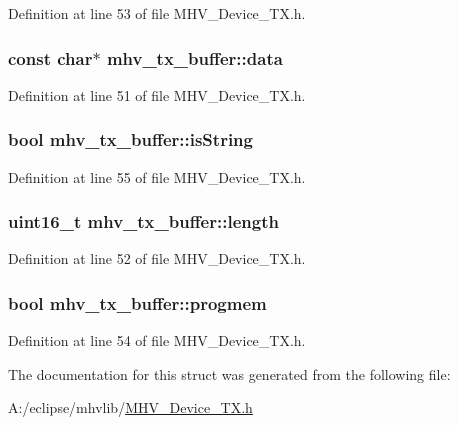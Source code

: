 \-Definition at line 53 of file \-M\-H\-V\-\_\-\-Device\-\_\-\-T\-X.\-h.

\hypertarget{structmhv__tx__buffer_a7523481b7a0b1d4972a79a4de6e528af}{
\subsubsection[{data}]{\setlength{\rightskip}{0pt plus 5cm}const char$\ast$ {\bf mhv\-\_\-tx\-\_\-buffer\-::data}}}
\label{structmhv__tx__buffer_a7523481b7a0b1d4972a79a4de6e528af}


\-Definition at line 51 of file \-M\-H\-V\-\_\-\-Device\-\_\-\-T\-X.\-h.

\hypertarget{structmhv__tx__buffer_a945fe73e41c397f3c4f7765c97469a35}{
\subsubsection[{is\-String}]{\setlength{\rightskip}{0pt plus 5cm}bool {\bf mhv\-\_\-tx\-\_\-buffer\-::is\-String}}}
\label{structmhv__tx__buffer_a945fe73e41c397f3c4f7765c97469a35}


\-Definition at line 55 of file \-M\-H\-V\-\_\-\-Device\-\_\-\-T\-X.\-h.

\hypertarget{structmhv__tx__buffer_ac05ef0da2f6fce474bec691e8e1fb4e2}{
\subsubsection[{length}]{\setlength{\rightskip}{0pt plus 5cm}uint16\-\_\-t {\bf mhv\-\_\-tx\-\_\-buffer\-::length}}}
\label{structmhv__tx__buffer_ac05ef0da2f6fce474bec691e8e1fb4e2}


\-Definition at line 52 of file \-M\-H\-V\-\_\-\-Device\-\_\-\-T\-X.\-h.

\hypertarget{structmhv__tx__buffer_a0b9b692bdd3d83c9a53e19a5c951fb74}{
\subsubsection[{progmem}]{\setlength{\rightskip}{0pt plus 5cm}bool {\bf mhv\-\_\-tx\-\_\-buffer\-::progmem}}}
\label{structmhv__tx__buffer_a0b9b692bdd3d83c9a53e19a5c951fb74}


\-Definition at line 54 of file \-M\-H\-V\-\_\-\-Device\-\_\-\-T\-X.\-h.



\-The documentation for this struct was generated from the following file\-:\begin{DoxyCompactItemize}
\item 
\-A\-:/eclipse/mhvlib/\hyperlink{_m_h_v___device___t_x_8h}{\-M\-H\-V\-\_\-\-Device\-\_\-\-T\-X.\-h}\end{DoxyCompactItemize}
